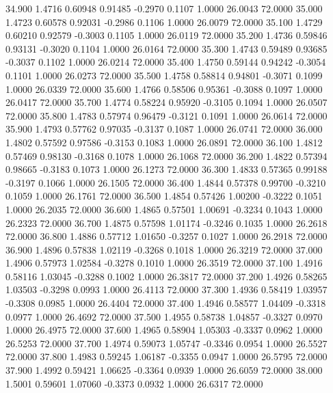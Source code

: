   34.900   1.4716   0.60948   0.91485  -0.2970   0.1107   1.0000  26.0043  72.0000
  35.000   1.4723   0.60578   0.92031  -0.2986   0.1106   1.0000  26.0079  72.0000
  35.100   1.4729   0.60210   0.92579  -0.3003   0.1105   1.0000  26.0119  72.0000
  35.200   1.4736   0.59846   0.93131  -0.3020   0.1104   1.0000  26.0164  72.0000
  35.300   1.4743   0.59489   0.93685  -0.3037   0.1102   1.0000  26.0214  72.0000
  35.400   1.4750   0.59144   0.94242  -0.3054   0.1101   1.0000  26.0273  72.0000
  35.500   1.4758   0.58814   0.94801  -0.3071   0.1099   1.0000  26.0339  72.0000
  35.600   1.4766   0.58506   0.95361  -0.3088   0.1097   1.0000  26.0417  72.0000
  35.700   1.4774   0.58224   0.95920  -0.3105   0.1094   1.0000  26.0507  72.0000
  35.800   1.4783   0.57974   0.96479  -0.3121   0.1091   1.0000  26.0614  72.0000
  35.900   1.4793   0.57762   0.97035  -0.3137   0.1087   1.0000  26.0741  72.0000
  36.000   1.4802   0.57592   0.97586  -0.3153   0.1083   1.0000  26.0891  72.0000
  36.100   1.4812   0.57469   0.98130  -0.3168   0.1078   1.0000  26.1068  72.0000
  36.200   1.4822   0.57394   0.98665  -0.3183   0.1073   1.0000  26.1273  72.0000
  36.300   1.4833   0.57365   0.99188  -0.3197   0.1066   1.0000  26.1505  72.0000
  36.400   1.4844   0.57378   0.99700  -0.3210   0.1059   1.0000  26.1761  72.0000
  36.500   1.4854   0.57426   1.00200  -0.3222   0.1051   1.0000  26.2035  72.0000
  36.600   1.4865   0.57501   1.00691  -0.3234   0.1043   1.0000  26.2323  72.0000
  36.700   1.4875   0.57598   1.01174  -0.3246   0.1035   1.0000  26.2618  72.0000
  36.800   1.4886   0.57712   1.01650  -0.3257   0.1027   1.0000  26.2918  72.0000
  36.900   1.4896   0.57838   1.02119  -0.3268   0.1018   1.0000  26.3219  72.0000
  37.000   1.4906   0.57973   1.02584  -0.3278   0.1010   1.0000  26.3519  72.0000
  37.100   1.4916   0.58116   1.03045  -0.3288   0.1002   1.0000  26.3817  72.0000
  37.200   1.4926   0.58265   1.03503  -0.3298   0.0993   1.0000  26.4113  72.0000
  37.300   1.4936   0.58419   1.03957  -0.3308   0.0985   1.0000  26.4404  72.0000
  37.400   1.4946   0.58577   1.04409  -0.3318   0.0977   1.0000  26.4692  72.0000
  37.500   1.4955   0.58738   1.04857  -0.3327   0.0970   1.0000  26.4975  72.0000
  37.600   1.4965   0.58904   1.05303  -0.3337   0.0962   1.0000  26.5253  72.0000
  37.700   1.4974   0.59073   1.05747  -0.3346   0.0954   1.0000  26.5527  72.0000
  37.800   1.4983   0.59245   1.06187  -0.3355   0.0947   1.0000  26.5795  72.0000
  37.900   1.4992   0.59421   1.06625  -0.3364   0.0939   1.0000  26.6059  72.0000
  38.000   1.5001   0.59601   1.07060  -0.3373   0.0932   1.0000  26.6317  72.0000
